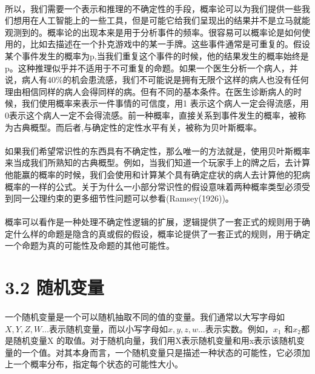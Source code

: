 \documentclass{article}
\begin{document}
    \paragraph{}
    所以，我们需要一个表示和推理的不确定性的手段，概率论可以为我们提供一些我们想用在人工智能上的一些工具，但是可能它给我们呈现出的结果并不是立马就能观测到的。概率论的出现本来是用于分析事件的频率。很容易可以概率论是如何使用的，比如去描述在一个扑克游戏中的某一手牌。这些事件通常是可重复的。假设某个事件发生的概率为p,当我们重复这个事件的时候，他的结果发生的概率始终是p。这种推理似乎并不适用于不可重复的命题。如果一个医生分析一个病人，并说，病人有40\%的机会患流感，我们不可能说是拥有无限个这样的病人也没有任何理由相信同样的病人会得同样的病。但有不同的基本条件。在医生诊断病人的时候，我们使用概率来表示一件事情的可信度，用1 表示这个病人一定会得流感，用0表示这个病人一定不会得流感。前一种概率，直接关系到事件发生的概率，被称为古典概型。而后者,与确定性的定性水平有关，被称为贝叶斯概率。
    \paragraph{}
    如果我们希望常识性的东西具有不确定性，那么唯一的方法就是，使用贝叶斯概率来当成我们所熟知的古典概型。例如，当我们知道一个玩家手上的牌之后，去计算他能赢的概率的时候，我们会使用和计算某个具有确定症状的病人去计算他的犯病概率的一样的公式。关于为什么一小部分常识性的假设意味着两种概率类型必须受到同一公理约束的更多细节性问题可以参看(Ramsey(1926))。
    \paragraph{}
    概率可以看作是一种处理不确定性逻辑的扩展，逻辑提供了一套正式的规则用于确定什么样的命题是隐含的真或假的假设，概率论提供了一套正式的规则，用于确定一个命题为真的可能性及命题的其他可能性。


    \section*{3.2 随机变量}
    \paragraph{}
    一个随机变量是一个可以随机抽取不同的值的变量。我们通常以大写字母如$X,Y,Z,W…$表示随机变量，而以小写字母如$x,y,z,w…$表示实数。例如，$x_1$ 和$x_2$都是随机变量X 的取值。对于随机向量，我们用X表示随机变量和用x表示该随机变量的一个值。对其本身而言，一个随机变量只是描述一种状态的可能性，它必须加上一个概率分布，指定每个状态的可能性大小。
\end{document}
